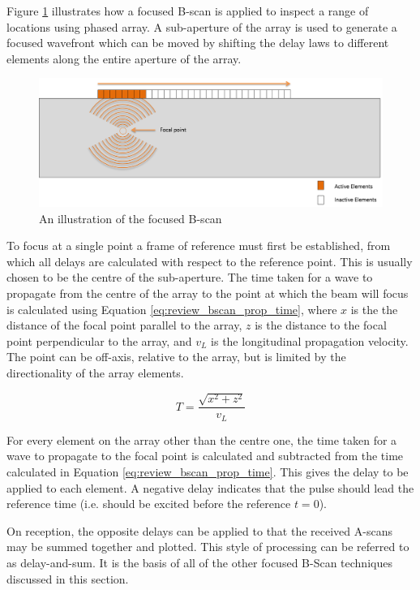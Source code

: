 Figure \ref{fig:FocusedB} illustrates how a focused B-scan is applied to inspect a range of locations using phased array. A sub-aperture of the array is used to generate a focused wavefront which can be moved by shifting the delay laws to different elements along the entire aperture of the array.

\begin{figure}[htbp]
\centering
		\includegraphics[width=\textwidth]{FocusedB.png}
		\caption{An illustration of the focused B-scan}
		\label{fig:FocusedB}
\end{figure}

To focus at a single point a frame of reference must first be established, from which all delays are calculated with respect to the reference point. This is usually chosen to be the centre of the sub-aperture. The time taken for a wave to propagate from the centre of the array to the point at which the beam will focus is calculated using Equation \ref{eq:review_bscan_prop_time}, where $x$ is the the distance of the focal point parallel to the array, $z$ is the distance to the focal point perpendicular to the array, and $v_L$ is the longitudinal propagation velocity. The point can be off-axis, relative to the array, but is limited by the directionality of the array elements.

\begin{equation} \label{eq:review_bscan_prop_time}
T = \frac{\sqrt{ x^2 + z^2 }}{v_L}
\end{equation}


For every element on the array other than the centre one, the time taken for a wave to propagate to the focal point is calculated and subtracted from the time calculated in Equation \ref{eq:review_bscan_prop_time}. This gives the delay to be applied to each element. A negative delay indicates that the pulse should lead the reference time (i.e. should be excited before the reference $t=0$).

On reception, the opposite delays can be applied to that the received A-scans may be summed together and plotted. This style of processing can be referred to as delay-and-sum. It is the basis of all of the other focused B-Scan techniques discussed in this section.


